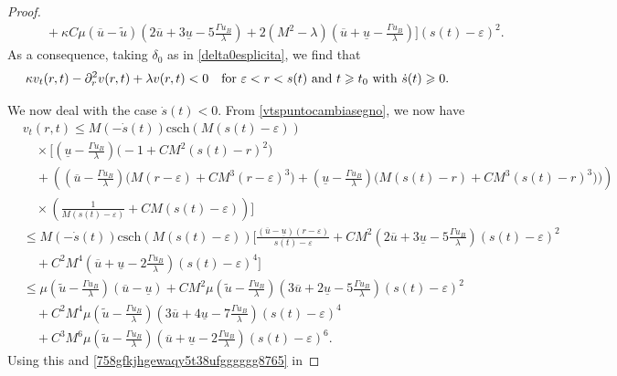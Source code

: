 \documentclass[12pt,a4paper,intlimits,sumlimits]{amsart}
\theoremstyle{definition}
\theoremstyle{plain}
\numberwithin{equation}{section}
\renewcommand{\leq}{\leqslant}
\renewcommand{\geq}{\geqslant}
\renewcommand{\ge}{\geqslant}
\begin{document}
\begin{proof}
\begin{eqnarray*}
&&\quad +\kappa C\mu(\overline u-\widetilde u)\left(2\overline u+3
\underline u-5\frac{\Gamma u_B}{\lambda} \right)+2(M^2-\lambda)\left(\overline u+\underline u -\frac{\Gamma u_B}{\lambda}\right)
\Bigg](s(t)-\varepsilon)^2 .
\end{eqnarray*}
As a consequence, taking $\delta_0$ as in \eqref{delta0esplicita}, we find that
\begin{equation}\label{veqn<01}
\kappa v_t(r, t)- \partial^2_r v(r, t) +\lambda v(r, t) <0
\quad \mbox{for~$ \varepsilon<r<s(t)$ and~$t\ge t_0$ with }\dot s(t)\geq 0.
\end{equation}

We now deal with the case $\dot s(t)< 0$. From \eqref{vtspuntocambiasegno}, we now have
\[
\begin{aligned}
&v_t(r, t)\leq M(-\dot s(t))\mbox{csch}(M(s(t)-\varepsilon))\\
& \quad
\times\Bigg[\left(\underline{u}-\frac{\Gamma u_B}{\lambda}\right)\big(
-1 + CM^2(s(t)-r)^2
\big) \\
&  \quad+\left(
 \left(\overline{u}  -\frac{\Gamma u_B}{\lambda}\right)
\big(M(r-\varepsilon) +CM^3(r-\varepsilon)^3
\big)+\left(\underline{u}-\frac{\Gamma u_B}{\lambda}\right)
\big(M(s(t)-r)+CM^3(s(t)-r)^3 )\big)\right)
\\
&\quad\times\left(
\frac1{M(s(t)-\varepsilon)} +CM(s(t)-\varepsilon)\right)
\Bigg] \\ 
&\leq M(-\dot s(t))\mbox{csch}(M(s(t)-\varepsilon))\Bigg[\frac{(\overline u-\underline u)(r-\varepsilon)}{s(t)-\varepsilon}
+CM^2\left(2\overline u+3\underline u-5\frac{\Gamma u_B}{\lambda}\right)(s(t)-\varepsilon)^2 \\
&\quad +C^2M^4\left(\overline u+\underline u-2\frac{\Gamma u_B}{\lambda}\right)(s(t)-\varepsilon)^4
\Bigg] \\
&\leq  \mu\left(\widetilde u-\frac{\Gamma u_B}{\lambda} \right)(\overline u-\underline u)
+CM^2\mu\left(\widetilde u-\frac{\Gamma u_B}{\lambda} \right)\left(3\overline u+2\underline u-5\frac{\Gamma u_B}{\lambda} \right)(s(t)-\varepsilon)^2 \\
&\quad +C^2M^4\mu\left(\widetilde u-\frac{\Gamma u_B}{\lambda} \right)\left(3\overline u+4\underline u-7\frac{\Gamma u_B}{\lambda} \right)(s(t)-\varepsilon)^4 \\
&\quad+C^3M^6\mu\left(\widetilde u-\frac{\Gamma u_B}{\lambda} \right)\left(\overline u+\underline u-2\frac{\Gamma u_B}{\lambda} \right)(s(t)-\varepsilon)^6.
\end{aligned}
\]
Using this and \eqref{758gfkjhgewaqy5t38ufgggggg8765} in 

\end{proof}
\end{document}
